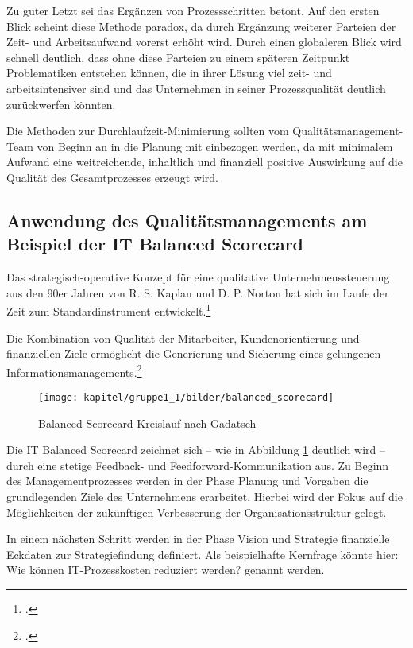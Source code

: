 Zu guter Letzt sei das Ergänzen von Prozessschritten betont. Auf den ersten Blick scheint diese Methode paradox, da durch Ergänzung weiterer Parteien der Zeit- und Arbeitsaufwand vorerst erhöht wird. Durch einen globaleren Blick wird schnell deutlich, dass ohne diese Parteien zu einem späteren Zeitpunkt Problematiken entstehen können, die in ihrer Lösung viel zeit- und arbeitsintensiver sind und das Unternehmen in seiner Prozessqualität deutlich zurückwerfen könnten.

Die Methoden zur Durchlaufzeit-Minimierung sollten vom Qualitätsmanagement-Team 
von Beginn an in die Planung mit einbezogen werden, da mit minimalem Aufwand eine 
weitreichende, inhaltlich und finanziell positive Auswirkung auf die Qualität des 
Gesamtprozesses erzeugt wird.

\subsection{Anwendung des Qualitätsmanagements am Beispiel der IT Balanced Scorecard}
\label{subsection_anwendung_it_balanced_scorecard}
Das strategisch-operative Konzept für eine qualitative Unternehmenssteuerung aus den 90er Jahren 
von R. S. Kaplan und D. P. Norton hat sich im Laufe der Zeit zum Standardinstrument 
entwickelt.\footcite{friedag_scorecard_2004}

Die Kombination von Qualität der Mitarbeiter, Kundenorientierung und finanziellen Ziele ermöglicht die 
Generierung und Sicherung eines gelungenen Informationsmanagements.\footcite{gabriel_inm_2003}

\begin{figure}[h!]
	\centering
	\texttt{[image: kapitel/gruppe1\_1/bilder/balanced\_scorecard]}
	\caption{Balanced Scorecard Kreislauf nach Gadatsch\protect\footnotemark}
	\label{fig_balanced_scorecard_cycle}
\end{figure}
\newpage

Die IT Balanced Scorecard zeichnet sich – wie in Abbildung \ref{fig_balanced_scorecard_cycle} deutlich wird – durch eine stetige Feedback- und Feedforward-Kommunikation aus. 
Zu Beginn des Managementprozesses werden in der Phase \glqq Planung und Vorgaben\grqq{} die 
grundlegenden Ziele des Unternehmens erarbeitet. Hierbei wird der Fokus auf die Möglichkeiten der 
zukünftigen Verbesserung der Organisationsstruktur gelegt.

In einem nächsten Schritt werden in der Phase \glqq Vision und Strategie\grqq{} finanzielle Eckdaten zur 
Strategiefindung definiert. Als beispielhafte Kernfrage könnte hier: \glqq Wie können IT-Prozesskosten reduziert werden?\grqq{} genannt werden.

